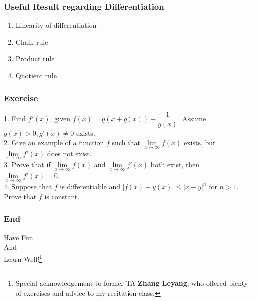 \documentclass[10pt, t]{beamer}
\newcommand{\nullspace}{~\\[15pt]}
\begin{document}
\begin{frame}
    \frametitle{Useful Result regarding Differentiation}

    \begin{enumerate}
        \item Linearity of differentiation
        \item Chain rule
        \item Product rule
        \item Quotient rule
    \end{enumerate}

\end{frame}

\begin{frame}
    \frametitle{Exercise}
    1. Find $f'(x)$, given $f(x)=g(x+g(x))+\dfrac{1}{g(x)}$. Assume $g(x)>0,g'(x)\neq 0$ exists.
    \nullspace
    2. Give an example of a function $f$ such that $\underset{x\to\infty}{\lim}f(x)$ exists, but $\underset{x\to\infty}{\lim}f'(x)$ does not exist.
    \nullspace
    3. Prove that if $\underset{x\to\infty}{\lim}f(x)$ and $\underset{x\to\infty}{\lim}f'(x)$ both exist, then $\underset{x\to\infty}{\lim}f'(x)=0$.
    \nullspace
    4. Suppose that $f$ is differentiable and $|f(x)-y(x)|\leq |x-y|^n$ for $n>1$. Prove that $f$ is constant.
\end{frame}

\begin{frame}
    \frametitle{End}
    \vspace{2.2cm}
    \begin{center}
        \Large
        Have Fun \\
        And \\
        Learn Well!\footnote[frame]{Special acknowledgement to former TA \textbf{Zhang Leyang}, who offered plenty of exercises and advice to my recitation class.}
    \end{center}
\end{frame}
\end{document}
